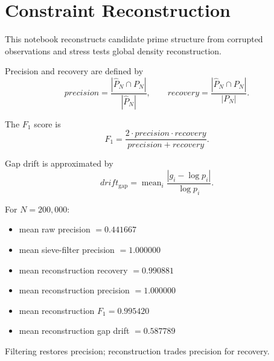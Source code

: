 \section*{Constraint Reconstruction}

This notebook reconstructs candidate prime structure from corrupted observations and stress tests global density reconstruction.

Precision and recovery are defined by
\[
precision = \frac{|\hat{P}_N\cap P_N|}{|\hat{P}_N|},
\qquad
recovery = \frac{|\hat{P}_N\cap P_N|}{|P_N|}.
\]

The $F_1$ score is
\[
F_1 = \frac{2\cdot precision\cdot recovery}{precision+recovery}.
\]

Gap drift is approximated by
\[
drift_{\mathrm{gap}}=\operatorname{mean}_i \frac{|g_i-\log p_i|}{\log p_i}.
\]

For $N=200,000$:
\begin{itemize}
  \item mean raw precision $= 0.441667$
  \item mean sieve-filter precision $= 1.000000$
  \item mean reconstruction recovery $= 0.990881$
  \item mean reconstruction precision $= 1.000000$
  \item mean reconstruction $F_1 = 0.995420$
  \item mean reconstruction gap drift $= 0.587789$
\end{itemize}

Filtering restores precision; reconstruction trades precision for recovery.
